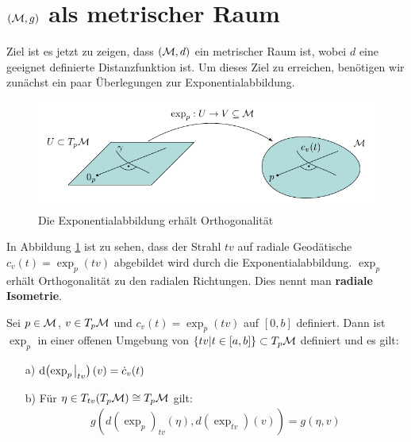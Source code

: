 \section{$(\mathcal{M}, g)$ als metrischer Raum} 
Ziel ist es jetzt zu zeigen, dass $(\mathcal{M}, d)$ ein metrischer Raum ist, 
wobei $d$ eine geeignet definierte Distanzfunktion ist.
Um dieses Ziel zu erreichen, benötigen wir zunächst ein paar Überlegungen zur Exponentialabbildung.
\begin{figure}[H]
\centering
\includegraphics[width=1\linewidth]{figures/tikz/exponentialfunction.pdf}
\caption{Die Exponentialabbildung erhält Orthogonalität}
\label{img:exponentialfunction}
\end{figure} 
In Abbildung \ref{img:exponentialfunction} ist zu sehen, dass der Strahl 
$t v$ auf radiale Geodätische $c_v(t) = \exp_p (t v)$ abgebildet wird durch die Exponentialabbildung.
$\exp_p$ erhält Orthogonalität zu den radialen Richtungen.
Dies nennt man \textbf{radiale Isometrie}.
\begin{lem}[Gaußlemma]
    \label{lem:gaußlemma}
    Sei $p \in \mathcal{M}$, $v \in T_p \mathcal{M} $ und $c_v(t) = \exp_p(tv)$ auf $[0, b]$ definiert.
    Dann ist $\exp_p$ in einer offenen Umgebung von $\{ tv \vert t\in [a, b] \} \subset T_p \mathcal{M}$ definiert und es gilt:
    \begin{itemize}
     \item[a)] $\dd ( \exp_p \eval_{t v})(v) = \dot{c}_v(t)$
    \item [b)] Für $\eta \in T_{tv} ( T_p \mathcal{M} ) \cong T_p \mathcal{M}$ gilt:
    \begin{align}
        g(d(\exp_p)_{tv} (\eta), d(\exp_{tv})(v)) = g(\eta, v)
    \end{align}
    \end{itemize}
\end{lem}
